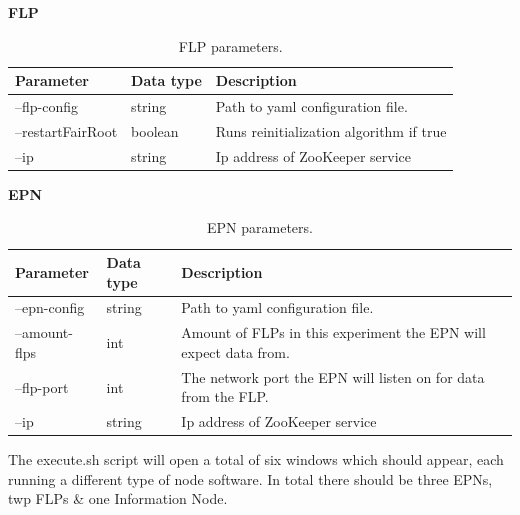 \documentclass[]{article}
\begin{document}
\begin{table}[H]
	\textbf{FLP}	
	\begin{center}	
		\begin{tabularx}{\textwidth}{ | l | l | X | }
			\hline
			\textbf{Parameter} & \textbf{Data type} & \textbf{Description} \\ \hline
					
			--flp-config & string & Path to yaml configuration file. \\ \hline
			--restartFairRoot & boolean & Runs reinitialization algorithm if true \\ \hline
			--ip & string & Ip address of ZooKeeper service \\ \hline
		\end{tabularx}
		\caption{FLP parameters.}
		\label{tab:flporiginal}
	\end{center}
\end{table}

\begin{table}[H]
	\textbf{EPN}	
	\begin{center}	
		\begin{tabularx}{\textwidth}{ | l | l | X | }
			\hline
			\textbf{Parameter} & \textbf{Data type} & \textbf{Description} \\ \hline
					
			--epn-config & string & Path to yaml configuration file. \\ \hline
			--amount-flps & int & Amount of FLPs in this experiment the EPN will expect data from. \\ \hline
			--flp-port & int & The network port the EPN will listen on for data from the FLP. \\ \hline
			--ip & string & Ip address of ZooKeeper service \\ \hline
		\end{tabularx}
		\caption{EPN parameters.}
		\label{tab:epnoriginal}
	\end{center}
\end{table}

The execute.sh script will open a total of six windows which should appear, each running a different type of node software. In total there should be three EPNs, twp FLPs \& one Information Node.
\end{document}
